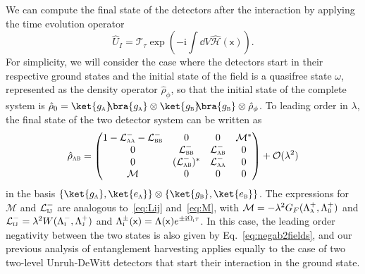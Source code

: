 \documentclass[letterpaper,12pt,titlepage,oneside,final]{book}
\newcommand{\mf}{\mathsf}%
\newcommand{\ii}{\mathrm{i}}
\newcommand{\tc}[1]{\textsc{#1}}
\begin{document}
We can compute the final state of the detectors after the interaction by applying the time evolution operator
\begin{equation}
    \hat{U}_I = \mathcal{T}_\tau\exp(-\ii \int \dd V \hat{\mathcal{H}}(\mf x)).
\end{equation}
For simplicity, we will consider the case where the detectors start in their respective ground states and the initial state of the field is a quasifree state $\omega$, represented as the density operator $\hat{\rho}_\phi$, so that the initial state of the complete system is $\hat{\rho}_0 = \ket{g_\tc{a}}\!\!\bra{g_\tc{a}}\otimes \ket{g_\tc{b}}\!\!\bra{g_\tc{b}}\otimes \hat{\rho}_\phi$. To leading order in $\lambda$, the final state of the two detector system can be written as
\begin{equation}\label{eq:UDWabFinal}
    \hat{\rho}_\tc{ab} = \begin{pmatrix}
        1 - \mathcal{L}_\tc{aa}^- - \mathcal{L}_\tc{bb}^- & 0 & 0 & \mathcal{M}^*\\
        0 & \mathcal{L}_\tc{bb}^- & \mathcal{L}_{\tc{ab}}^- & 0\\
        0 & (\mathcal{L}_\tc{ab}^-)^* & \mathcal{L}_\tc{aa}^- & 0\\
        \mathcal{M} & 0 & 0 & 0
    \end{pmatrix} + \mathcal{O}(\lambda^2)
\end{equation}
in the basis $\{\ket{g_\tc{a}},\ket{e_\tc{a}}\}\otimes \{\ket{g_\tc{b}},\ket{e_\tc{b}}\}$. The expressions for $\mathcal{M}$ and $\mathcal{L}_{\tc{ij}}^-$ are analogous to~\eqref{eq:Lij} and~\eqref{eq:M}, with $\mathcal{M} = - \lambda^2 G_F(\Lambda_\tc{a}^+,\Lambda_\tc{b}^+)$ and $\mathcal{L}_{\tc{ij}}^- = \lambda^2 W(\Lambda_\tc{i}^-,\Lambda_\tc{j}^+)$ and $\Lambda_\tc{i}^\pm(\mf x) = \Lambda(\mf x) e^{\pm \ii \Omega_\tc{i}\tau}$. In this case, the leading order negativity between the two states is also given by Eq.~\eqref{eq:negab2fields}, and our previous analysis of entanglement harvesting applies equally to the case of two two-level Unruh-DeWitt detectors that start their interaction in the ground state. 
\end{document}
